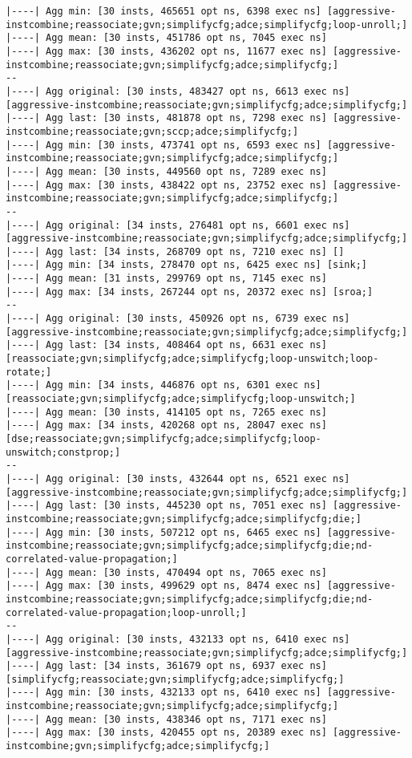 \documentclass{vldb}
\begin{document}
\begin{lstlisting}
|----| Agg min: [30 insts, 465651 opt ns, 6398 exec ns] [aggressive-instcombine;reassociate;gvn;simplifycfg;adce;simplifycfg;loop-unroll;]
|----| Agg mean: [30 insts, 451786 opt ns, 7045 exec ns]
|----| Agg max: [30 insts, 436202 opt ns, 11677 exec ns] [aggressive-instcombine;reassociate;gvn;simplifycfg;adce;simplifycfg;]
--
|----| Agg original: [30 insts, 483427 opt ns, 6613 exec ns] [aggressive-instcombine;reassociate;gvn;simplifycfg;adce;simplifycfg;]
|----| Agg last: [30 insts, 481878 opt ns, 7298 exec ns] [aggressive-instcombine;reassociate;gvn;sccp;adce;simplifycfg;]
|----| Agg min: [30 insts, 473741 opt ns, 6593 exec ns] [aggressive-instcombine;reassociate;gvn;simplifycfg;adce;simplifycfg;]
|----| Agg mean: [30 insts, 449560 opt ns, 7289 exec ns]
|----| Agg max: [30 insts, 438422 opt ns, 23752 exec ns] [aggressive-instcombine;reassociate;gvn;simplifycfg;adce;simplifycfg;]
--
|----| Agg original: [34 insts, 276481 opt ns, 6601 exec ns] [aggressive-instcombine;reassociate;gvn;simplifycfg;adce;simplifycfg;]
|----| Agg last: [34 insts, 268709 opt ns, 7210 exec ns] []
|----| Agg min: [34 insts, 278470 opt ns, 6425 exec ns] [sink;]
|----| Agg mean: [31 insts, 299769 opt ns, 7145 exec ns]
|----| Agg max: [34 insts, 267244 opt ns, 20372 exec ns] [sroa;]
--
|----| Agg original: [30 insts, 450926 opt ns, 6739 exec ns] [aggressive-instcombine;reassociate;gvn;simplifycfg;adce;simplifycfg;]
|----| Agg last: [34 insts, 408464 opt ns, 6631 exec ns] [reassociate;gvn;simplifycfg;adce;simplifycfg;loop-unswitch;loop-rotate;]
|----| Agg min: [34 insts, 446876 opt ns, 6301 exec ns] [reassociate;gvn;simplifycfg;adce;simplifycfg;loop-unswitch;]
|----| Agg mean: [30 insts, 414105 opt ns, 7265 exec ns]
|----| Agg max: [34 insts, 420268 opt ns, 28047 exec ns] [dse;reassociate;gvn;simplifycfg;adce;simplifycfg;loop-unswitch;constprop;]
--
|----| Agg original: [30 insts, 432644 opt ns, 6521 exec ns] [aggressive-instcombine;reassociate;gvn;simplifycfg;adce;simplifycfg;]
|----| Agg last: [30 insts, 445230 opt ns, 7051 exec ns] [aggressive-instcombine;reassociate;gvn;simplifycfg;adce;simplifycfg;die;]
|----| Agg min: [30 insts, 507212 opt ns, 6465 exec ns] [aggressive-instcombine;reassociate;gvn;simplifycfg;adce;simplifycfg;die;nd-correlated-value-propagation;]
|----| Agg mean: [30 insts, 470494 opt ns, 7065 exec ns]
|----| Agg max: [30 insts, 499629 opt ns, 8474 exec ns] [aggressive-instcombine;reassociate;gvn;simplifycfg;adce;simplifycfg;die;nd-correlated-value-propagation;loop-unroll;]
--
|----| Agg original: [30 insts, 432133 opt ns, 6410 exec ns] [aggressive-instcombine;reassociate;gvn;simplifycfg;adce;simplifycfg;]
|----| Agg last: [34 insts, 361679 opt ns, 6937 exec ns] [simplifycfg;reassociate;gvn;simplifycfg;adce;simplifycfg;]
|----| Agg min: [30 insts, 432133 opt ns, 6410 exec ns] [aggressive-instcombine;reassociate;gvn;simplifycfg;adce;simplifycfg;]
|----| Agg mean: [30 insts, 438346 opt ns, 7171 exec ns]
|----| Agg max: [30 insts, 420455 opt ns, 20389 exec ns] [aggressive-instcombine;gvn;simplifycfg;adce;simplifycfg;]
\end{lstlisting}
\end{document}
